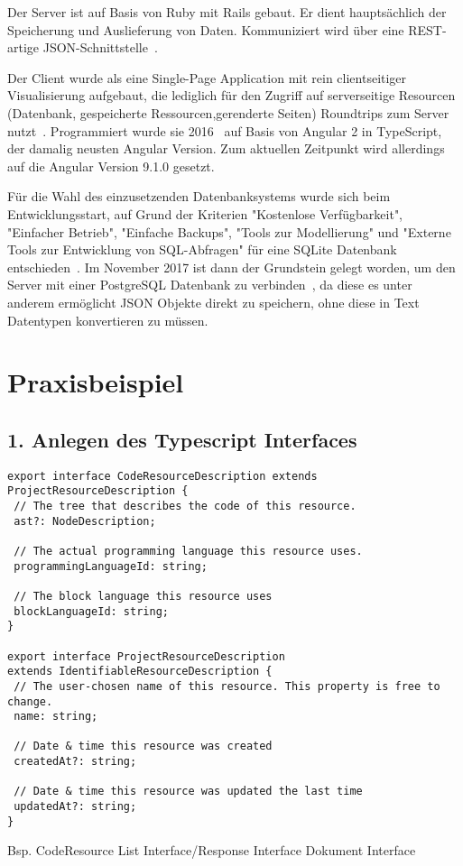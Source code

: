 Der Server ist auf Basis von Ruby mit Rails gebaut. Er dient hauptsächlich der Speicherung und Auslieferung von Daten.
Kommuniziert wird über eine REST-artige JSON-Schnittstelle~\cite[94]{riemer2016}.

Der Client wurde als eine Single-Page Application mit rein clientseitiger Visualisierung aufgebaut,
die lediglich für den Zugriff auf serverseitige Resourcen  (Datenbank, gespeicherte Ressourcen,gerenderte Seiten) Roundtrips zum Server nutzt~\cite[94-95]{riemer2016}.
Programmiert wurde sie 2016~\cite[1]{riemer2016} auf Basis von Angular 2 in TypeScript, der damalig neusten Angular Version.
Zum aktuellen Zeitpunkt wird allerdings auf die Angular Version 9.1.0 gesetzt.


Für die Wahl des einzusetzenden Datenbanksystems wurde sich beim Entwicklungsstart, auf Grund der Kriterien "Kostenlose Verfügbarkeit",
"Einfacher Betrieb", "Einfache Backups", "Tools zur Modellierung" und "Externe Tools zur Entwicklung von SQL-Abfragen"
für eine SQLite Datenbank entschieden~\cite[99-100]{riemer2016}. Im November 2017 ist dann der Grundstein gelegt worden,
um den Server mit einer PostgreSQL Datenbank zu verbinden~\cite{riemerPostgresCommit}, da diese es unter anderem ermöglicht JSON Objekte direkt zu speichern,
ohne diese in Text Datentypen konvertieren zu müssen.
\section{Praxisbeispiel}

\subsection{1. Anlegen des Typescript Interfaces}

\begin{lstlisting}
export interface CodeResourceDescription extends ProjectResourceDescription {
 // The tree that describes the code of this resource.
 ast?: NodeDescription;

 // The actual programming language this resource uses.
 programmingLanguageId: string;

 // The block language this resource uses
 blockLanguageId: string;
}

export interface ProjectResourceDescription
extends IdentifiableResourceDescription {
 // The user-chosen name of this resource. This property is free to change.
 name: string;

 // Date & time this resource was created
 createdAt?: string;

 // Date & time this resource was updated the last time
 updatedAt?: string;
}
\end{lstlisting}
Bsp. CodeResource
List Interface/Response Interface
Dokument Interface
